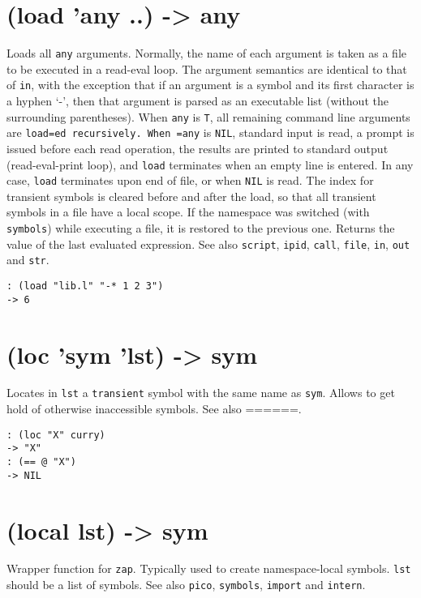 {{{{{{ 
\section{(load 'any ..) -> any}
\label{sec-8-1-12-24}


Loads all \texttt{any} arguments. Normally, the name of each argument is taken
as a file to be executed in a read-eval loop. The argument semantics are
identical to that of \texttt{in}, with the exception that if an argument is a
symbol and its first character is a hyphen `-', then that argument is
parsed as an executable list (without the surrounding parentheses). When
\texttt{any} is \texttt{T}, all remaining command line arguments are \texttt{load=ed recursively. When =any} is \texttt{NIL}, standard input is read, a prompt is
issued before each read operation, the results are printed to standard
output (read-eval-print loop), and \texttt{load} terminates when an empty line
is entered. In any case, \texttt{load} terminates upon end of file, or when
\texttt{NIL} is read. The index for transient symbols is cleared before and
after the load, so that all transient symbols in a file have a local
scope. If the namespace was switched (with \texttt{symbols}) while executing a
file, it is restored to the previous one. Returns the value of the last
evaluated expression. See also \texttt{script}, \texttt{ipid}, \texttt{call}, \texttt{file}, \texttt{in},
\texttt{out} and \texttt{str}.


\begin{verbatim}
: (load "lib.l" "-* 1 2 3")
-> 6
\end{verbatim}

 
\section{(loc 'sym 'lst) -> sym}
\label{sec-8-1-12-25}


Locates in \texttt{lst} a \texttt{transient} symbol with the same name as \texttt{sym}.
Allows to get hold of otherwise inaccessible symbols. See also ======.


\begin{verbatim}
: (loc "X" curry)
-> "X"
: (== @ "X")
-> NIL
\end{verbatim}

 
\section{(local lst) -> sym}
\label{sec-8-1-12-26}


Wrapper function for \texttt{zap}. Typically used to create namespace-local
symbols. \texttt{lst} should be a list of symbols. See also \texttt{pico}, \texttt{symbols},
\texttt{import} and \texttt{intern}.


}}}}}}
